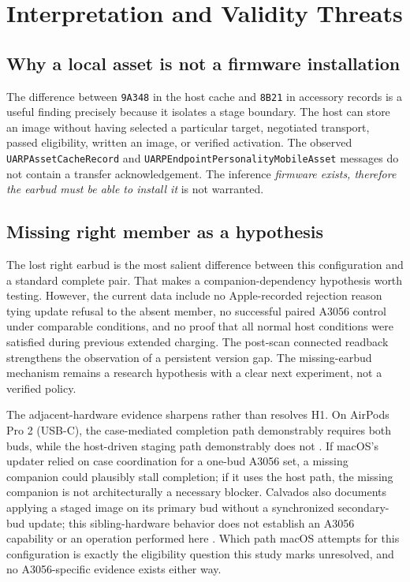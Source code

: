 \documentclass[11pt,letterpaper]{article}
\begin{document}
\section{Interpretation and Validity Threats}\label{sec:validity}
\subsection{Why a local asset is not a firmware installation}
The difference between \texttt{9A348} in the host cache and \texttt{8B21} in accessory records is a useful finding precisely because it isolates a stage boundary. The host can store an image without having selected a particular target, negotiated transport, passed eligibility, written an image, or verified activation. The observed \texttt{UARPAssetCacheRecord} and \texttt{UARPEndpointPersonalityMobileAsset} messages do not contain a transfer acknowledgement. The inference \emph{firmware exists, therefore the earbud must be able to install it} is not warranted.

\subsection{Missing right member as a hypothesis}
The lost right earbud is the most salient difference between this configuration and a standard complete pair. That makes a companion-dependency hypothesis worth testing. However, the current data include no Apple-recorded rejection reason tying update refusal to the absent member, no successful paired A3056 control under comparable conditions, and no proof that all normal host conditions were satisfied during previous extended charging. The post-scan connected readback strengthens the observation of a persistent version gap. The missing-earbud mechanism remains a research hypothesis with a clear next experiment, not a verified policy.

The adjacent-hardware evidence sharpens rather than resolves H1. On AirPods Pro 2 (USB-C), the case-mediated completion path demonstrably requires both buds, while the host-driven staging path demonstrably does not \cite{calvados}. If macOS's updater relied on case coordination for a one-bud A3056 set, a missing companion could plausibly stall completion; if it uses the host path, the missing companion is not architecturally a necessary blocker. Calvados also documents applying a staged image on its primary bud without a synchronized secondary-bud update; this sibling-hardware behavior does not establish an A3056 capability or an operation performed here \cite{calvados}. Which path macOS attempts for this configuration is exactly the eligibility question this study marks unresolved, and no A3056-specific evidence exists either way.
\end{document}
